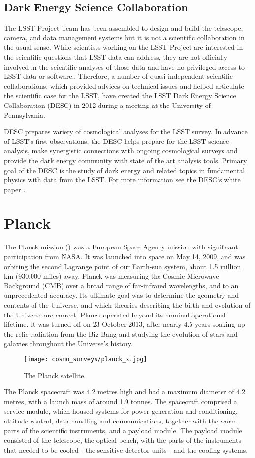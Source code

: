 \subsection{Dark Energy Science Collaboration}
The LSST Project Team has been assembled to design and build the telescope, camera, and data management systems but it is not a scientific collaboration in the usual sense. While scientists working on the LSST Project are interested in the scientific questions that LSST data can address, they are not officially involved in the scientific analyses of those data and have no privileged access to LSST data or software.. Therefore, a number of quasi-independent scientific collaborations, which provided advices on technical issues and helped articulate the scientific case for the LSST, have created the LSST Dark Energy Science Collaboration (DESC) in 2012 during a meeting at the University of Pennsylvania.

DESC prepares variety of cosmological analyses for the LSST survey. In advance of LSST's first observations, the DESC helps prepare for the LSST science analysis, make synergistic connections with ongoing cosmological surveys and provide the dark energy community with state of the art analysis tools. Primary goal of the DESC is the study of dark energy and related topics in fundamental physics with data from the LSST. For more information see the DESC`s white paper \cite{desc_white}.

\section{Planck}
The Planck mission (\cite{planck}) was a European Space Agency mission with significant participation from NASA. It was launched into space on May 14, 2009, and was orbiting the second Lagrange point of our Earth-sun system, about 1.5 million km (930,000 miles) away. Planck was measuring the Cosmic Microwave Background (CMB) over a broad range of far-infrared wavelengths, and to an unprecedented accuracy. Its ultimate goal was to determine the geometry and contents of the Universe, and which theories describing the birth and evolution of the Universe are correct. Planck operated beyond its nominal operational lifetime. It was turned off on 23 October 2013, after nearly 4.5 years soaking up the relic radiation from the Big Bang and studying the evolution of stars and galaxies throughout the Universe's history.

\begin{figure}[htb]
    \centering
    \texttt{[image: cosmo\_surveys/planck\_s.jpg]}
    \caption{The Planck satellite.}
    \label{fig:planck}
\end{figure}
The Planck spacecraft was 4.2 metres high and had a maximum diameter of 4.2 metres, with a launch mass of around 1.9 tonnes. The spacecraft comprised a service module, which housed systems for power generation and conditioning, attitude control, data handling and communications, together with the warm parts of the scientific instruments, and a payload module. The payload module consisted of the telescope, the optical bench, with the parts of the instruments that needed to be cooled - the sensitive detector units - and the cooling systems.

